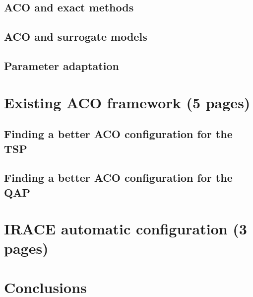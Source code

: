 \documentclass[12pt]{article}
\begin{document}
\subsection{ACO and exact methods}

\subsection{ACO and surrogate models}

\subsection{Parameter adaptation}

\section{Existing ACO framework (5 pages)}

\subsection{Finding a better ACO configuration for the TSP}

\subsection{Finding a better ACO configuration for the QAP}

\section{IRACE automatic configuration (3 pages)}

\section{Conclusions}

\begin{thebibliography}{1}

\end{thebibliography}
\end{document}
